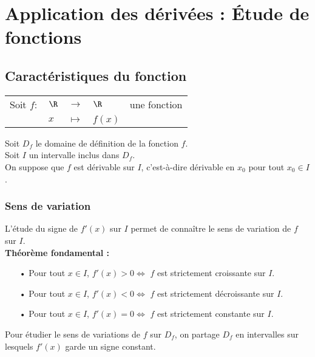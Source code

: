 \section{Application des dérivées : Étude de fonctions}

\subsection{Caractéristiques du fonction}

\begin{tabular}{lllll}
Soit $f :$ & $\R$ & $\longrightarrow$ & $\R$ & une fonction \\
& $x$ & $\longmapsto$ & $f(x)$ & \\
\end{tabular}

\vspace*{.3cm}

Soit $D_f$ le domaine de définition de la fonction $f$. \\
Soit $I$ un intervalle inclus dans $D_f$. \\
On suppose que $f$ est dérivable sur $I$, c'est-à-dire dérivable en $x_0$ pour tout $x_0 \in I$. 

\subsubsection{Sens de variation}

L'étude du signe de $f'(x)$ sur $I$ permet de connaître le sens de variation de $f$ sur $I$. \\

\textbf{Théorème fondamental :} \\

\begin{itemize}
\item[•] Pour tout $x \in I$, $f'(x) > 0 \Longleftrightarrow$ $f$ est strictement croissante sur $I$. 
\item[•] Pour tout $x \in I$, $f'(x) < 0 \Longleftrightarrow$ $f$ est strictement décroissante sur $I$. 
\item[•] Pour tout $x \in I$, $f'(x) = 0 \Longleftrightarrow$ $f$ est strictement constante sur $I$. 
\end{itemize}

\vspace*{.3cm}

Pour étudier le sens de variations de $f$ sur $D_f$, on partage $D_f$ en intervalles sur lesquels $f'(x)$ garde un signe constant. 

